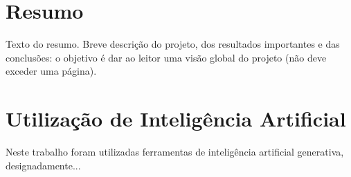 \documentclass[a4paper,openright,twoside,11pt]{report}
\begin{document}
\cleardoublepage
\chapter*{Resumo}
Texto do resumo.
Breve descrição do projeto, dos resultados importantes e das conclusões: o objetivo é dar ao leitor uma visão global do projeto (não deve exceder uma página).



\cleardoublepage
\chapter*{Utilização de Inteligência Artificial}
Neste trabalho foram utilizadas ferramentas de inteligência artificial generativa, designadamente...\\

\cleardoublepage
\tableofcontents \cleardoublepage


\setcounter{page}{1}












\appendix

\end{document}
